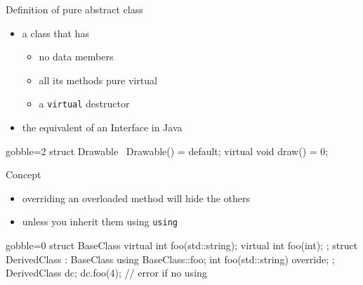 \begin{frame}[fragile]
  \begin{block}{Definition of pure abstract class}
    \begin{itemize}
    \item a class that has
      \begin{itemize}
        \item no data members
        \item all its methods pure virtual
        \item a \texttt{virtual} destructor
      \end{itemize}
    \item the equivalent of an Interface in Java
    \end{itemize}
  \end{block}
  \begin{multicols}{2}
    \begin{cppcode*}{gobble=2}
      struct Drawable {
        ~Drawable() = default;
        virtual void draw() = 0;
      }
    \end{cppcode*}
    \columnbreak
    \center
  \end{multicols}
\end{frame}

\begin{frame}[fragile]
  \begin{block}{Concept}
    \begin{itemize}
    \item overriding an overloaded method will hide the others
    \item unless you inherit them using \texttt{using}
    \end{itemize}
  \end{block}
  \begin{cppcode*}{gobble=0}
    struct BaseClass {
      virtual int foo(std::string);
      virtual int foo(int);
    };
    struct DerivedClass : BaseClass {
      using BaseClass::foo;
      int foo(std::string) override;
    };
    DerivedClass dc;
    dc.foo(4);      // error if no using
    \end{cppcode*}
\end{frame}

